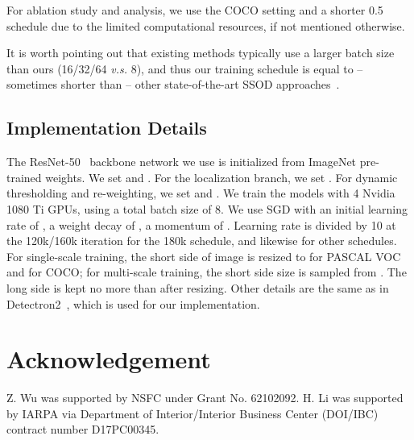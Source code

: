\documentclass[letterpaper]{article} \usepackage{aaai22}  \usepackage{times}  \usepackage{helvet}  \usepackage{courier}  \usepackage[hyphens]{url}  \usepackage{graphicx} \urlstyle{rm} \def\UrlFont{\rm}  \usepackage{natbib}  \usepackage{caption} \DeclareCaptionStyle{ruled}{labelfont=normalfont,labelsep=colon,strut=off} \frenchspacing  \setlength{\pdfpagewidth}{8.5in}  \setlength{\pdfpageheight}{11in}  \usepackage{algorithm}
\begin{document}
For ablation study and analysis, we use the  COCO setting and a shorter 0.5 schedule due to the limited computational resources, if not mentioned otherwise.

It is worth pointing out that existing methods typically use a larger batch size than ours (16/32/64 \emph{v.s.} 8), and thus our training schedule is equal to -- sometimes shorter than -- other state-of-the-art SSOD approaches~\cite{stac,unbiasedteacher,tang2021humble,instantteaching,ismt}. 
 
\subsection{Implementation Details} 

The ResNet-50~\cite{resnet} backbone network we use is initialized from ImageNet pre-trained weights. We set  and . For the localization branch, we set . For dynamic thresholding and re-weighting, we set  and . We train the models with 4 Nvidia 1080 Ti GPUs, using a total batch size of 8. We use SGD with an initial learning rate of ,  a weight decay of , a momentum of . Learning rate is divided by 10 at the 120k/160k iteration for the 180k schedule, and likewise for other schedules. For single-scale training, the short side of image is resized to  for PASCAL VOC and  for COCO; for multi-scale training, the short side size is sampled from . The long side is kept no more than  after resizing. Other details are the same as in Detectron2~\cite{wu2019detectron2}, which is used for our implementation.


\section*{Acknowledgement}

Z. Wu was supported by NSFC under Grant No. 62102092. H. Li was supported by IARPA via Department of Interior/Interior Business Center (DOI/IBC) contract number D17PC00345. 








\end{document}
